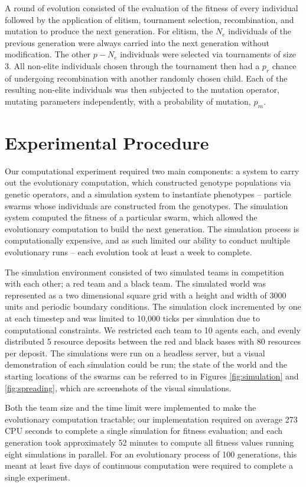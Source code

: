 \documentclass[conference,final]{IEEEtran}
\begin{document}
A round of evolution consisted of the evaluation of the fitness of every individual followed by the application of elitism, tournament selection, recombination, and mutation to produce the next generation. For elitism, the $N_e$ individuals of the previous generation were always carried into the next generation without modification. The other $p-N_e$ individuals were selected via tournaments of size 3. All non-elite individuals chosen through the tournament then had a $p_r$ chance of undergoing recombination with another randomly chosen child. Each of the resulting non-elite individuals was then subjected to the mutation operator, mutating parameters independently, with a probability of mutation, $p_m$.

\section{Experimental Procedure}

Our computational experiment required two main components: a system to carry out the evolutionary computation, which constructed genotype populations via genetic operators, and a simulation system to instantiate phenotypes -- particle swarms whose individuals are constructed from the genotypes. The simulation system computed the fitness of a particular swarm, which allowed the evolutionary computation to build the next generation. The simulation process is computationally expensive, and as such limited our ability to conduct multiple evolutionary runs -- each evolution took at least a week to complete.

The simulation environment consisted of two simulated teams in competition with each other; a red team and a black team. The simulated world was represented as a two dimensional square grid with a height and width of 3000 units and periodic boundary conditions. The simulation clock incremented by one at each timestep and was limited to 10,000 ticks per simulation due to computational constraints. We restricted each team to 10 agents each, and evenly distributed 5 resource deposits between the red and black bases with 80 resources per deposit. The simulations were run on a headless server, but a visual demonstration of each simulation could be run; the state of the world and the starting locations of the swarms can be referred to in Figures \ref{fig:simulation} and \ref{fig:spreading}, which are screenshots of the visual simulations.

Both the team size and the time limit were implemented to make the evolutionary computation tractable; our implementation required on average 273 CPU seconds to complete a single simulation for fitness evaluation; and each generation took approximately 52 minutes to compute all fitness values running eight simulations in parallel. For an evolutionary process of 100 generations, this meant at least five days of continuous computation were required to complete a single experiment.
\end{document}
